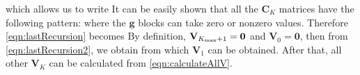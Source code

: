 which allows us to write
It can be easily shown that all the $\mathbf{C}_{K}$ matrices have the following pattern:
where the $\mathbf{g}$ blocks can take zero or nonzero values. Therefore \autoref{eqn:lastRecursion} becomes
By definition, $\mathbf{V}_{K_{\rm max}+1} = \mathbf{0}$ and $\mathbf{V}_{0} = \mathbf{0}$, then from 
\autoref{eqn:lastRecursion2}, we obtain
from which $\mathbf{V}_{1}$ can be obtained. After that, all other $\mathbf{V}_K$ can be calculated from \autoref{eqn:calculateAllV}. 

